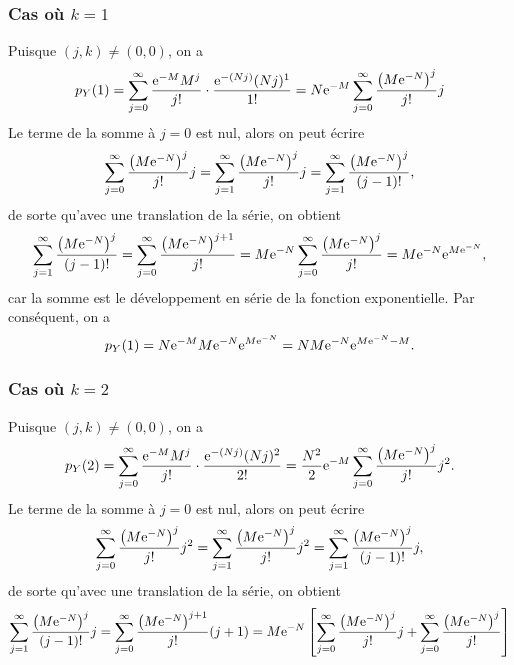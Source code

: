 \documentclass[11pt]{article}
\newcommand\e{%
    \ensuremath{%
        \mathrm{e}%
    }%
}
\begin{document}
\subsubsection*{Cas où \boldmath $k=1$}
Puisque $(j,k)\neq (0,0)$, on a
\begin{equation*}
    p_Y(1)
    =\sum_{j=0}^\infty\frac{\e^{-M}M^j}{j!}\cdot\frac{\e^{-(Nj)}(Nj)^1}{1!}
    =N\e^{-M}\sum_{j=0}^\infty\frac{\left(M\e^{-N}\right)^j}{j!}j
\end{equation*}
Le terme de la somme à $j=0$ est nul, alors on peut écrire
\begin{equation}\label{eq:part1}
    \sum_{j=0}^\infty\frac{\left(M\e^{-N}\right)^j}{j!}j
    =\sum_{j=1}^\infty\frac{\left(M\e^{-N}\right)^j}{j!}j
    =\sum_{j=1}^\infty\frac{\left(M\e^{-N}\right)^j}{(j-1)!},
\end{equation}
de sorte qu'avec une translation de la série, on obtient
\begin{equation}\label{eq:part2}
    \sum_{j=1}^\infty\frac{\left(M\e^{-N}\right)^j}{(j-1)!}
    =\sum_{j=0}^\infty\frac{\left(M\e^{-N}\right)^{j+1}}{j!}
    =M\e^{-N}\sum_{j=0}^\infty\frac{\left(M\e^{-N}\right)^j}{j!}
    =M\e^{-N}\e^{M\e^{-N}},
\end{equation}
car la somme est le développement en série de la fonction exponentielle. Par
conséquent, on a
\begin{equation*}
    p_Y(1)
    =N\e^{-M}M\e^{-N}\e^{M\e^{-N}}
    =NM\e^{-N}\e^{M\e^{-N}-M}.
\end{equation*}

\subsubsection*{Cas où \boldmath $k=2$}
Puisque $(j,k)\neq (0,0)$, on a
\begin{equation*}
    p_Y(2)
    =\sum_{j=0}^\infty\frac{\e^{-M}M^j}{j!}\cdot\frac{\e^{-(Nj)}(Nj)^2}{2!}
    =\frac{N^2}{2}\e^{-M}\sum_{j=0}^\infty\frac{\left(M\e^{-N}\right)^j}{j!}j^2.
\end{equation*}
Le terme de la somme à $j=0$ est nul, alors on peut écrire
\begin{equation*}
    \sum_{j=0}^\infty\frac{\left(M\e^{-N}\right)^j}{j!}j^2
    =\sum_{j=1}^\infty\frac{\left(M\e^{-N}\right)^j}{j!}j^2
    =\sum_{j=1}^\infty\frac{\left(M\e^{-N}\right)^j}{(j-1)!}j,
\end{equation*}
de sorte qu'avec une translation de la série, on obtient
\begin{equation*}
    \sum_{j=1}^\infty\frac{\left(M\e^{-N}\right)^j}{(j-1)!}j
    =\sum_{j=0}^\infty\frac{\left(M\e^{-N}\right)^{j+1}}{j!}(j+1)
    =M\e^{-N}\left[
        \sum_{j=0}^\infty\frac{\left(M\e^{-N}\right)^j}{j!}j+
        \sum_{j=0}^\infty\frac{\left(M\e^{-N}\right)^j}{j!}
    \right]
\end{equation*}
\end{document}
